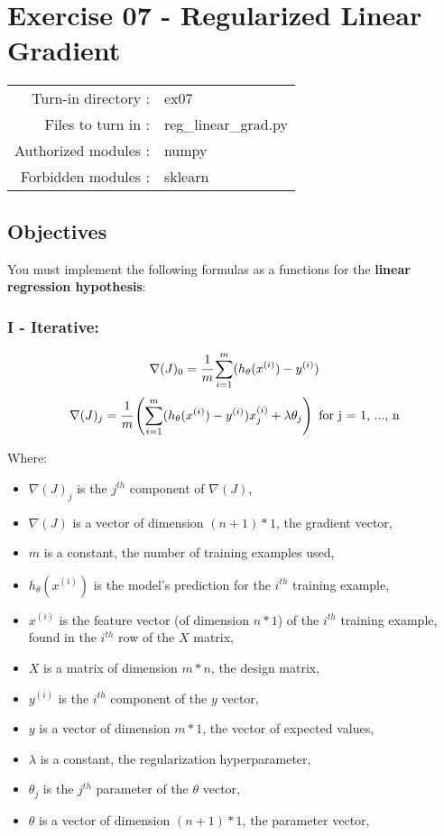 \documentclass[]{article}
\begin{document}
\hypertarget{exercise-07---regularized-linear-gradient-1}{%
\section{Exercise 07 - Regularized Linear
Gradient}\label{exercise-07---regularized-linear-gradient-1}}

\begin{longtable}[]{@{}rl@{}}
\toprule
\endhead
Turn-in directory : & ex07\tabularnewline
Files to turn in : & reg\_linear\_grad.py\tabularnewline
Authorized modules : & numpy\tabularnewline
Forbidden modules : & sklearn\tabularnewline
\bottomrule
\end{longtable}

\hypertarget{objectives-6}{%
\subsection{Objectives}\label{objectives-6}}

You must implement the following formulas as a functions for the
\textbf{linear regression hypothesis}:

\hypertarget{i---iterative}{%
\subsubsection{I - Iterative:}\label{i---iterative}}

\large

\[
\nabla(J)_0 = \cfrac{1}{m}\sum_{i=1}^{m}(h_\theta(x^{(i)}) - y^{(i)})
\] \normalsize \large \[
\nabla(J)_j = \cfrac{1}{m}\left(\sum_{i=1}^{m}(h_\theta(x^{(i)}) - y^{(i)})x_j^{(i)} + \lambda \theta_j\right) \text{ for j = 1, ..., n}
\] \normalsize

Where:

\begin{itemize}
\item
  \(\nabla(J)_j\) is the \(j^{th}\) component of \(\nabla(J)\),
\item
  \(\nabla(J)\) is a vector of dimension \((n + 1) * 1\), the gradient
  vector,
\item
  \(m\) is a constant, the number of training examples used,
\item
  \(h_\theta(x^{(i)})\) is the model's prediction for the \(i^{th}\)
  training example,
\item
  \(x^{(i)}\) is the feature vector (of dimension \(n * 1\)) of the
  \(i^{th}\) training example, found in the \(i^{th}\) row of the \(X\)
  matrix,
\item
  \(X\) is a matrix of dimension \(m * n\), the design matrix,
\item
  \(y^{(i)}\) is the \(i^{th}\) component of the \(y\) vector,
\item
  \(y\) is a vector of dimension \(m * 1\), the vector of expected
  values,
\item
  \(\lambda\) is a constant, the regularization hyperparameter,
\item
  \(\theta_j\) is the \(j^{th}\) parameter of the \(\theta\) vector,
\item
  \(\theta\) is a vector of dimension \((n + 1) * 1\), the parameter
  vector,
\end{itemize}
\end{document}
